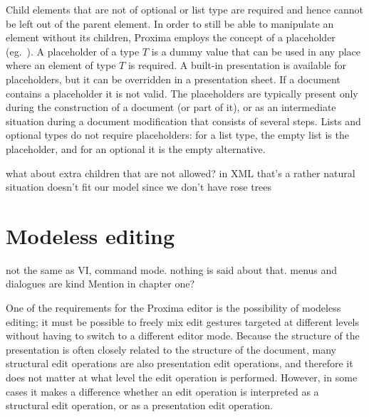 Child elements that are not of optional or list type are required and hence cannot be left out of the parent element. In order to still be able to manipulate an element without its children, Proxima employs the concept of a placeholder (eg.~\cite{syngen}). A placeholder of a type $T$ is a dummy value that can be used in any place where an element of type $T$ is required. A built-in presentation is available for placeholders, but it can be overridden in a presentation sheet. If a document contains a placeholder it is not valid. The placeholders are typically present only during the construction of a document (or part of it), or as an intermediate situation during a document modification that consists of several steps. Lists and optional types do not require placeholders: for a list type, the empty list is the placeholder, and for an optional it is the empty alternative.

\bc
what about extra children that are not allowed? in XML that's a rather natural situation doesn't fit our model since we don't have rose trees
\ec

%																
%																
%																
\section{Modeless editing}

\bc
not the same as VI, command mode. nothing is said about that. menus and dialogues are kind %
Mention in chapter one?
\ec

One of the requirements for the Proxima editor is the possibility of modeless editing; it must be possible to freely mix edit gestures targeted at different levels without having to switch to a different editor mode. Because the structure of the presentation is often closely related to the structure of the document, many structural edit operations are also presentation edit operations, and therefore it does not matter at what level the edit operation is performed. However, in some cases it makes a difference whether an edit operation is interpreted as a structural edit operation, or as a presentation edit operation.


